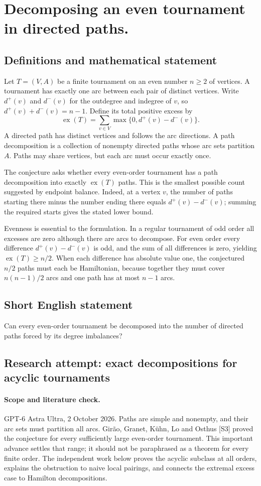 \documentclass[11pt,a4paper]{article}
\begin{document}
\section*{Decomposing an even tournament in directed paths.}\label{statement}

\subsection{Definitions and mathematical statement}
Let $T=(V,A)$ be a finite tournament on an even number $n\ge2$ of
vertices. A tournament has exactly one arc between each pair of
distinct vertices. Write $d^+(v)$ and $d^-(v)$ for the outdegree and
indegree of $v$, so $d^+(v)+d^-(v)=n-1$. Define its total positive excess
by
\[
 \operatorname{ex}(T)=\sum_{v\in V}\max\{0,d^+(v)-d^-(v)\}.
\]
A directed path has distinct vertices and follows the arc directions.
A path decomposition is a collection of nonempty directed paths whose
arc sets partition $A$. Paths may share vertices, but each arc must
occur exactly once.

The conjecture asks whether every even-order tournament has a path
decomposition into exactly $\operatorname{ex}(T)$ paths. This is the
smallest possible count suggested by endpoint balance. Indeed, at a
vertex $v$, the number of paths starting there minus the number ending
there equals $d^+(v)-d^-(v)$; summing the required starts gives the stated
lower bound.

Evenness is essential to the formulation. In a regular tournament of
odd order all excesses are zero although there are arcs to decompose.
For even order every difference $d^+(v)-d^-(v)$ is odd, and the sum of
all differences is zero, yielding $\operatorname{ex}(T)\ge n/2$.
When each difference has absolute value one, the conjectured $n/2$
paths must each be Hamiltonian, because together they must cover
$n(n-1)/2$ arcs and one path has at most $n-1$ arcs.
\subsection{Short English statement}
Can every even-order tournament be decomposed into the number of directed paths forced by its degree imbalances?
\subsection{Research attempt: exact decompositions for acyclic tournaments}
\paragraph{Scope and literature check.}
GPT-6 Astra Ultra, 2 October 2026. Paths are simple and nonempty,
and their arc sets must partition all arcs. Gir\~ao, Granet,
K\"uhn, Lo and Osthus [S3] proved the conjecture for every sufficiently
large even-order tournament. This important advance settles that
range; it should not be paraphrased as a theorem for every finite
order. The independent work below proves the acyclic subclass at
all orders, explains the obstruction to naive local pairings, and
connects the extremal excess case to Hamilton decompositions.
\end{document}
